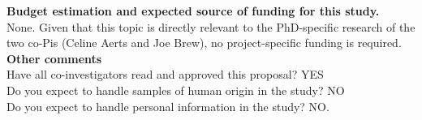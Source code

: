\documentclass{article}
\begin{document}
\noindent \textbf{Budget estimation and expected source of funding for this study.} \\

\noindent None. Given that this topic is directly relevant to the PhD-specific research of the two co-Pis (Celine Aerts and Joe Brew), no project-specific funding is required. \\

\noindent \textbf{Other comments} \\

\noindent Have all co-investigators read and approved this proposal? YES \\
\noindent Do you expect to handle samples of human origin in the study? NO \\
\noindent Do you expect to handle personal information in the study? NO. 




\newpage


{}
  
\end{document}
